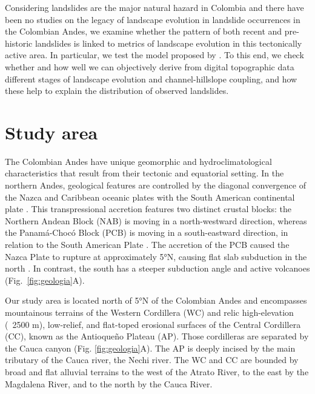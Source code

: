\documentclass[draft]{agujournal2019}
\begin{document}
\par Considering landslides are the major natural hazard in Colombia \cite{gomez2023spatial, aristizabal2020}
and there have been no studies on the legacy of landscape evolution in landslide occurrences in the Colombian Andes, we examine whether the pattern of both recent and pre-historic landslides is linked to metrics of landscape evolution in this tectonically active area. In particular, we test the model proposed by . To this end, we check whether and how well we can objectively derive from digital topographic data different stages of landscape evolution and channel-hillslope coupling, and how these help to explain the distribution of observed landslides.

\section{Study area}
\par The Colombian Andes have unique geomorphic and hydroclimatological characteristics that result from their tectonic and equatorial setting. In the northern Andes, geological features are controlled by the diagonal convergence of the Nazca and Caribbean oceanic plates with the South American continental plate \cite{Cediel2003, acosta2007, trenkamp2002}. This transpressional accretion features two distinct crustal blocks: the Northern Andean Block (NAB) is moving in a north-westward direction, whereas the Panamá-Chocó Block (PCB) is moving in a south-eastward direction, in relation to the South American Plate \cite{kellogg1995}. The accretion of the PCB caused the Nazca Plate to rupture at approximately 5°N, causing flat slab subduction in the north \cite{Taboada2000}. In contrast, the south has a steeper subduction angle and active volcanoes \cite{perez2021, restrepo2019, farris2011, Taboada2000, mann1990} (Fig.~\ref{fig:geologia}A). 

\par Our study area is located north of 5°N of the Colombian Andes and encompasses mountainous terrains of the Western Cordillera (WC) and relic high-elevation (~2500 m), low-relief, and flat-toped erosional surfaces of the Central Cordillera (CC), known as the Antioqueño Plateau (AP).  Those cordilleras are separated by the Cauca canyon (Fig. \ref{fig:geologia}A). The AP is deeply incised by the main tributary of the Cauca river, the Nechi river. The WC and CC are bounded by broad and flat alluvial terrains to the west of the Atrato River, to the east by the Magdalena River, and to the north by the Cauca River. 
\end{document}
